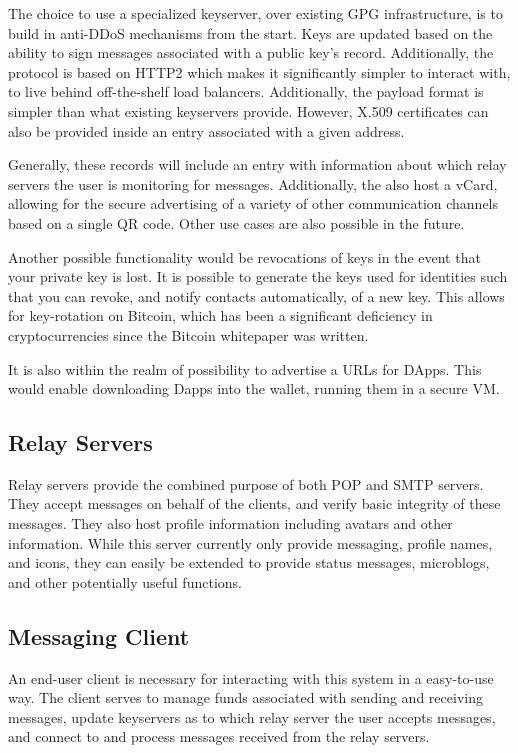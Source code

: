 \documentclass{article}
\theoremstyle{definition}
\begin{document}
The choice to use a specialized keyserver, over existing GPG infrastructure, is to build in anti-DDoS mechanisms from the start. Keys are updated based on the ability to sign messages associated with a public key's record. Additionally, the protocol is based on HTTP2 which makes it significantly simpler to interact with, to live behind off-the-shelf load balancers. Additionally, the payload format is simpler than what existing keyservers provide. However, X.509 certificates can also be provided inside an entry associated with a given address.

Generally, these records will include an entry with information about which relay servers the user is monitoring for messages. Additionally, the also host a vCard, allowing for the secure advertising of a variety of other communication channels based on a single QR code. Other use cases are also possible in the future.

Another possible functionality would be revocations of keys in the event that your private key is lost. It is possible to generate the keys used for identities such that you can revoke, and notify contacts automatically, of a new key. This allows for key-rotation on Bitcoin, which has been a significant deficiency in cryptocurrencies since the Bitcoin whitepaper was written.

It is also within the realm of possibility to advertise a URLs for DApps. This would enable downloading Dapps into the wallet, running them in a secure VM.

\subsection{Relay Servers}
Relay servers provide the combined purpose of both POP and SMTP servers. They accept messages on behalf of the clients, and verify basic integrity of these messages. They also host profile information including avatars and other information. While this server currently only provide messaging, profile names, and icons, they can easily be extended to provide status messages, microblogs, and other potentially useful functions.

\subsection{Messaging Client}
An end-user client is necessary for interacting with this system in a easy-to-use way. The client serves to manage funds associated with sending and receiving messages,   update keyservers as to which relay server the user accepts messages, and connect to and process messages received from the relay servers.
\end{document}
